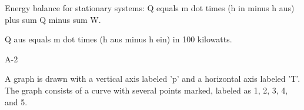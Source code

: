 Energy balance for stationary systems:
Q equals m dot times (h in minus h aus) plus sum Q minus sum W.

Q aus equals m dot times (h aus minus h ein) in 100 kilowatts.

A-2

A graph is drawn with a vertical axis labeled 'p' and a horizontal axis labeled 'T'. The graph consists of a curve with several points marked, labeled as 1, 2, 3, 4, and 5.